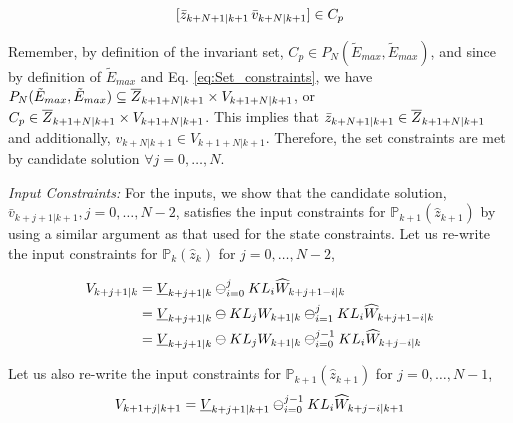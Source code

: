 \begin{equation}
\label{eq:CandidateInC}
[\bar{z}_{k+N+1|k+1}\, \bar{v}_{k+N|k+1}] \in C_p
\end{equation}

Remember, by definition of the invariant set, $C_p \in P_N(\tilde{E}_{max},\tilde{E}_{max})$, and since by definition of $\tilde{E}_{max}$ and Eq. \ref{eq:Set_constraints}, we have $P_N(\tilde{E}_{max},\tilde{E}_{max}) \subseteq \overline{Z}_{k+1+N|k+1} \times V_{k+1+N|k+1}$, or $C_p \in  \overline{Z}_{k+1+N|k+1} \times {V}_{k+1+N|k+1}$. This implies that $\bar{z}_{k+N+1|k+1} \in \overline{Z}_{k+1+N|k+1}$ and additionally, $v_{k+N|k+1} \in {V}_{k+1+N|k+1}$.
Therefore, the set constraints are met by candidate solution $\forall j=0,\dotsc,N$. 

\textit{Input Constraints:} For the inputs, we show that the candidate solution, $\bar{v}_{k+j+1|k+1}, j=0,\ldots,N-2$, satisfies the input constraints for $\mathbb{P}_{k+1}(\hat{z}_{k+1}) $ by using a similar argument as that used for the state constraints. 
Let us re-write the input constraints for $\mathbb{P}_{k}(\hat{z}_{k})$ for $j=0,\dotsc,N-2$,

\begin{subequations}
\label{eq:V_redef}
\begin{align}
V_{k+j+1|k}&=\underline{V}_{k+j+1|k} \ominus_{i=0}^{j} KL_i\widehat{W}_{k+j+1-i|k} \\
&=\underline{V}_{k+j+1|k} \ominus KL_jW_{k+1|k} \ominus_{i=1}^{j} KL_i\widehat{W}_{k+j+1-i|k} \\
&=\underline{V}_{k+j+1|k} \ominus KL_jW_{k+1|k} \ominus_{i=0}^{j-1} KL_i\widehat{W}_{k+j-i|k}
\end{align}
\end{subequations}

Let us also re-write the input constraints for $\mathbb{P}_{k+1}(\hat{z}_{k+1})$ for $j=0,\dotsc,N-1$,
\begin{equation}
\label{eq:Vjkp1}
V_{k+1+j|k+1}=\underline{V}_{k+j+1|k+1} \ominus_{i=0}^{j-1} KL_i\widehat{W}_{k+j-i|k+1}
\end{equation}

